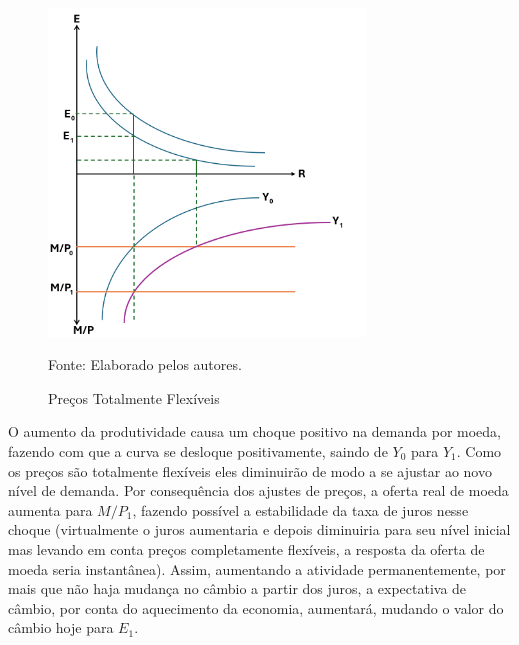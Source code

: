 \documentclass[a4paper,12pt]{article}[abntex2]
\begin{document}
\begin{figure}[H]
    \centering
    \caption{Preços Totalmente Flexíveis} 
    \includegraphics[width=0.75\textwidth]{Macroeconomia Internacional/APS 3 Macro Int/Preços Totalmente Flexíveis.png}
    \label{fig:preçoflexível}
    
    \footnotesize{Fonte: Elaborado pelos autores.}
    \end{figure}

O aumento da produtividade causa um choque positivo na demanda por moeda, fazendo com que  a curva se desloque positivamente, saindo de $Y_0$ para $Y_1$. Como os preços são totalmente flexíveis eles diminuirão de modo a se ajustar ao novo nível de demanda. Por consequência dos ajustes de preços, a oferta real de moeda aumenta para $M/P_1$, fazendo possível a estabilidade da taxa de juros nesse choque (virtualmente o juros aumentaria e depois diminuiria para seu nível inicial mas levando em conta preços completamente flexíveis, a resposta da oferta de moeda seria instantânea). Assim, aumentando a atividade permanentemente, por mais que não haja mudança no câmbio a partir dos juros, a expectativa de câmbio, por conta do aquecimento da economia, aumentará, mudando o valor do câmbio hoje para $E_1$.
\end{document}
